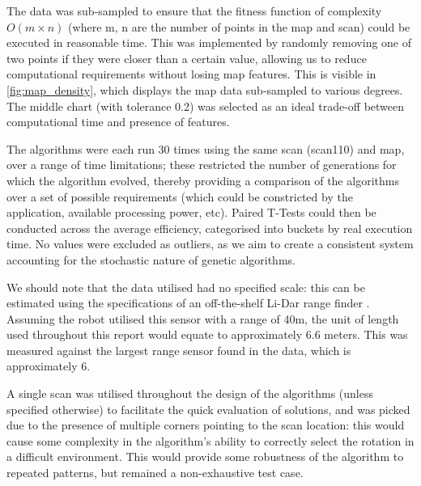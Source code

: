 \documentclass[authoryearcitations]{UoYCSproject}
\begin{document}
The data was sub-sampled to ensure that the fitness function of complexity $O(m\times n)$ (where m, n are the number of points in the map and scan) could be executed in reasonable time. This was implemented by randomly removing one of two points if they were closer than a certain value, allowing us to reduce computational requirements without losing map features. This is visible in \autoref{fig:map_density}, which displays the map data sub-sampled to various degrees. The middle chart (with tolerance 0.2) was selected as an ideal trade-off between computational time and presence of features. \newline

The algorithms were each run 30 times using the same scan (scan110) and map, over a range of time limitations; these restricted the number of generations for which the algorithm evolved, thereby providing a comparison of the algorithms over a set of possible requirements (which could be constricted by the application, available processing power, etc). Paired T-Tests could then be conducted across the average efficiency, categorised into buckets by real execution time. No values were excluded as outliers, as we aim to create a consistent system accounting for the stochastic nature of genetic algorithms. \newline

We should note that the data utilised had no specified scale: this can be estimated using the specifications of an off-the-shelf Li-Dar range finder \cite{noauthor_undated-bu}. Assuming the robot utilised this sensor with a range of 40m, the unit of length used throughout this report would equate to approximately 6.6 meters. This was measured against the largest range sensor found in the data, which is approximately 6. \newline

A single scan was utilised throughout the design of the algorithms (unless specified otherwise) to facilitate the quick evaluation of solutions, and was picked due to the presence of multiple corners pointing to the scan location: this would cause some complexity in the algorithm's ability to correctly select the rotation in a difficult environment. This would provide some robustness of the algorithm to repeated patterns, but remained a non-exhaustive test case. \newline
\end{document}
